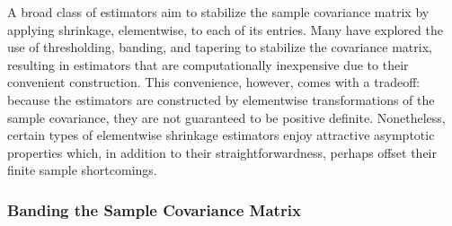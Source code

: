 A broad class of estimators aim to stabilize the sample covariance matrix by applying shrinkage, elementwise, to each of its entries. Many have explored the use of thresholding, banding, and tapering to stabilize the covariance matrix, resulting in estimators that are computationally inexpensive due to their convenient construction. This convenience, however, comes with a tradeoff: because the estimators are constructed by elementwise transformations of the sample covariance, they are not guaranteed to be positive definite.  Nonetheless, certain types of elementwise shrinkage estimators enjoy attractive asymptotic properties \citep{bickel2008regularized} which, in addition to their straightforwardness, perhaps  offset their finite sample shortcomings. 


\subsubsection{Banding the Sample Covariance Matrix}
 
